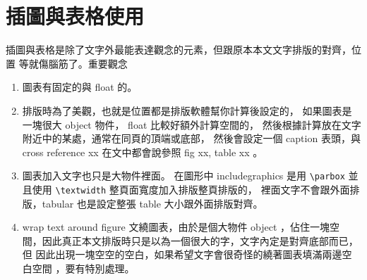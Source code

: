 \section{插圖與表格使用}
插圖與表格是除了文字外最能表達觀念的元素，但跟原本本文文字排版的對齊，位置
等就傷腦筋了。重要觀念
\begin{enumerate}
  \item 圖表有固定的與 float 的。
  \item 排版時為了美觀，也就是位置都是排版軟體幫你計算後設定的， 如果圖表是
    一塊很大 object 物件， float 比較好額外計算空間的， 然後根據計算放在文字
    附近中的某處，通常在同頁的頂端或底部， 然後會設定一個 caption 表頭，與
    cross reference xx 在文中都會說參照 fig xx, table xx 。
  \item 圖表加入文字也只是大物件裡面。 在圖形中 includegraphics 是用
    \verb=\parbox= 並且使用 \verb=\textwidth= 整頁面寬度加入排版整頁排版的，
    裡面文字不會跟外面排版，tabular 也是設定整張 table 大小跟外面排版對齊。
  \item wrap text around figure 文繞圖表，由於是個大物件 object ，佔住一塊空
    間，因此真正本文排版時只是以為一個很大的字，文字內定是對齊底部而已，但
    因此出現一塊空空的空白，如果希望文字會很奇怪的繞著圖表填滿兩邊空白空間
    ，要有特別處理。  
\end{enumerate}

